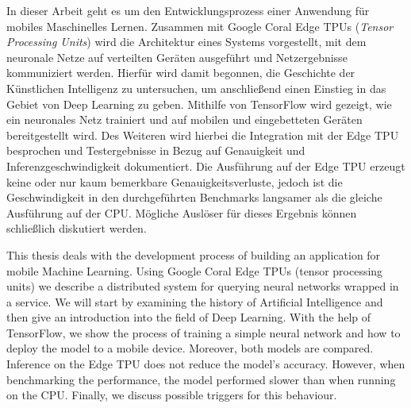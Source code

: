 \newenvironment{abstractpage}
{\cleardoublepage\vspace*{\fill}\thispagestyle{empty}}
{\vfill\cleardoublepage}
\newenvironment{myabstract}[1]
{\bigskip\selectlanguage{#1}
  \begin{center}
    \bfseries\abstractname
  \end{center}}
{\par\bigskip}

\begin{abstractpage}
\begin{myabstract}{german}
In dieser Arbeit geht es um den Entwicklungsprozess einer Anwendung
für mobiles Maschinelles Lernen. Zusammen mit Google Coral Edge TPUs
(\textit{Tensor Processing Units})
wird die Architektur eines Systems vorgestellt, mit dem
neuronale Netze auf verteilten Geräten ausgeführt
und Netzergebnisse kommuniziert werden.
Hierfür wird damit begonnen, die Geschichte der Künstlichen Intelligenz
zu untersuchen, um anschließend einen Einstieg in das Gebiet
von Deep Learning zu geben. Mithilfe von TensorFlow wird
gezeigt, wie ein neuronales Netz trainiert
und auf mobilen und eingebetteten Geräten bereitgestellt wird.
Des Weiteren wird hierbei die Integration mit der Edge TPU besprochen
und Testergebnisse in Bezug auf Genauigkeit und Inferenzgeschwindigkeit
dokumentiert. Die Ausführung auf der Edge TPU erzeugt keine
oder nur kaum bemerkbare Genauigkeitsverluste, jedoch ist die Geschwindigkeit
in den durchgeführten Benchmarks
langsamer als die gleiche Ausführung auf der CPU.
Mögliche Auslöser für dieses Ergebnis können schließlich diskutiert werden.
\end{myabstract}
\begin{myabstract}{english}
This thesis deals with the development process of building
an application for mobile Machine Learning.
Using Google Coral Edge TPUs (tensor processing units)
we describe a distributed system
for querying neural networks wrapped in a service.
We will start by examining the history of Artificial Intelligence
and then give an introduction into the field of Deep Learning.
With the help of TensorFlow, we show the process of training a
simple neural network and how to deploy the model to
a mobile device. Moreover, both models are compared.
Inference on the Edge TPU does not reduce the model's accuracy.
However, when benchmarking the performance,
the model performed slower than when running on the CPU.
Finally, we discuss possible triggers for this behaviour.
\end{myabstract}
\end{abstractpage}